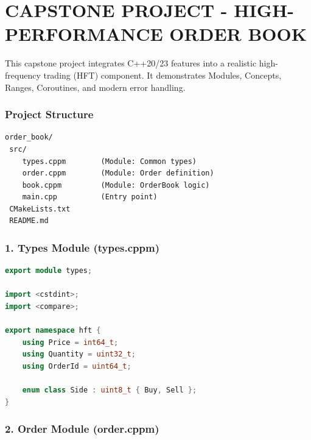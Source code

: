 \hypertarget{capstone-project---high-performance-order-book}{%
\chapter{CAPSTONE PROJECT - HIGH-PERFORMANCE ORDER
BOOK}\label{capstone-project---high-performance-order-book}}

This capstone project integrates C++20/23 features into a realistic
high-frequency trading (HFT) component. It demonstrates Modules,
Concepts, Ranges, Coroutines, and modern error handling.

\hypertarget{project-structure}{%
\subsection{Project Structure}\label{project-structure}}

\begin{lstlisting}
order_book/
 src/
    types.cppm        (Module: Common types)
    order.cppm        (Module: Order definition)
    book.cppm         (Module: OrderBook logic)
    main.cpp          (Entry point)
 CMakeLists.txt
 README.md
\end{lstlisting}

\hypertarget{types-module-types.cppm}{%
\subsection{1. Types Module
(types.cppm)}\label{types-module-types.cppm}}

\begin{lstlisting}[language={C++}]
export module types;

import <cstdint>;
import <compare>;

export namespace hft {
    using Price = int64_t;
    using Quantity = uint32_t;
    using OrderId = uint64_t;

    enum class Side : uint8_t { Buy, Sell };
}
\end{lstlisting}

\hypertarget{order-module-order.cppm}{%
\subsection{2. Order Module
(order.cppm)}\label{order-module-order.cppm}}

